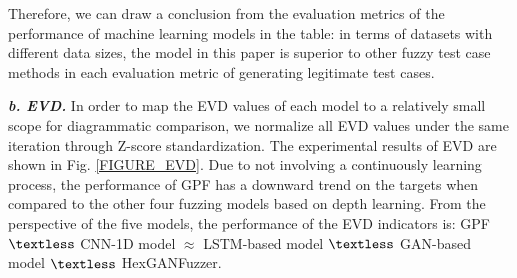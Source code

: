Therefore, we can draw a conclusion from the evaluation metrics of the performance of machine learning models in the table: in terms of datasets with different data sizes, the model in this paper is superior to other fuzzy test case methods in each evaluation metric of generating legitimate test cases.


\quad \textit{\textbf{b. EVD.}}
In order to map the EVD values of each model to a relatively small scope for diagrammatic comparison, we normalize all EVD values under the same iteration through Z-score standardization. The experimental results of EVD are shown in Fig. \ref{FIGURE_EVD}. Due to not involving a continuously learning process, the performance of GPF has a downward trend on the targets when compared to the other four fuzzing models based on depth learning. From the perspective of the five models, the performance of the EVD indicators is: GPF $\textless$ CNN-1D model $\approx$ LSTM-based model $\textless$ GAN-based model $\textless$ HexGANFuzzer. 

